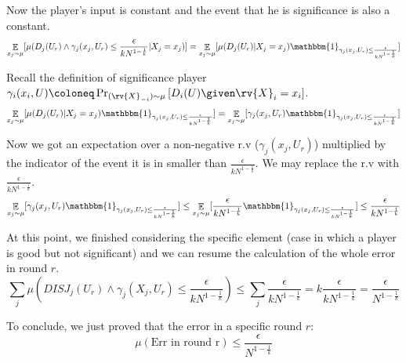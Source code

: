 Now the player's input is constant and the event that he is significance is also a constant.
\begin{equation*}
  \underset{x_j \sim \mu}{\mathop{\mathbb{E}}}[\mu(D_j(U_r) \land \gamma_j(x_j, U_r) \leq \frac{\epsilon}{kN^{1-\frac{1}{k}}} | X_j = x_j)] = \underset{x_j \sim \mu}{\mathop{\mathbb{E}}}[\mu(D_j(U_r) | X_j = x_j) \mathbbm{1}_{\gamma_j(x_j, U_r) \leq \frac{\epsilon}{kN^{1-\frac{1}{k}}}}]
\end{equation*}

Recall the definition of significance player $\gamma_i(x_i, U) \coloneq \Pr_{(\rv{X}_{-i}) \sim \mu}\left[D_i (U) \given \rv{X}_i = x_i \right]$.
\begin{equation*}
  \underset{x_j \sim \mu}{\mathop{\mathbb{E}}}[\mu(D_j(U_r) | X_j = x_j) \mathbbm{1}_{\gamma_j(x_j, U_r) \leq \frac{\epsilon}{kN^{1-\frac{1}{k}}}}] = \underset{x_j \sim \mu}{\mathop{\mathbb{E}}}[\gamma_j(x_j, U_r) \mathbbm{1}_{\gamma_j(x_j, U_r) \leq \frac{\epsilon}{kN^{1-\frac{1}{k}}}}]
\end{equation*}

Now we got an expectation over a non-negative r.v ($\gamma_j(x_j, U_r)$) multiplied by the indicator of the event it is in smaller than $\frac{\epsilon}{kN^{1-\frac{1}{k}}}$. We may replace the r.v with $\frac{\epsilon}{kN^{1-\frac{1}{k}}}$.
\begin{equation*}
  \underset{x_j \sim \mu}{\mathop{\mathbb{E}}}[\gamma_j(x_j, U_r) \mathbbm{1}_{\gamma_j(x_j, U_r) \leq \frac{\epsilon}{kN^{1-\frac{1}{k}}}}] \leq \underset{x_j \sim \mu}{\mathop{\mathbb{E}}}[\frac{\epsilon}{kN^{1-\frac{1}{k}}} \mathbbm{1}_{\gamma_j(x_j, U_r) \leq \frac{\epsilon}{kN^{1-\frac{1}{k}}}}] \leq \frac{\epsilon}{kN^{1-\frac{1}{k}}}
\end{equation*}

At this point, we finished considering the specific element (case in which a player is good but not significant) and we can resume the calculation of the whole error in round $r$.  \newline
\begin{equation*}
  \sum_j \mu(DISJ_j(U_r) \land \gamma_j(X_j, U_r) \leq \frac{\epsilon}{kN^{1-\frac{1}{k}}}) \leq \sum_j \frac{\epsilon}{kN^{1-\frac{1}{k}}} = k\frac{\epsilon}{kN^{1-\frac{1}{k}}} = \frac{\epsilon}{N^{1-\frac{1}{k}}}
\end{equation*}

To conclude, we just proved that the error in a specific round $r$:
\begin{equation*}
  \mu(\text{Err in round r}) \leq \frac{\epsilon}{N^{1-\frac{1}{k}}}
\end{equation*}

